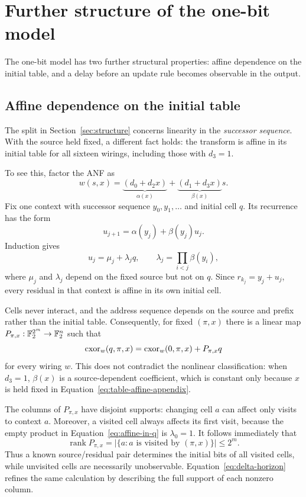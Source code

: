 \section{Further structure of the one-bit model}\label{sec:further-structure}

The one-bit model has two further structural properties: affine dependence on the initial table,
and a delay before an update rule becomes observable in the output.

\subsection{Affine dependence on the initial table}

The split in Section~\ref{sec:structure} concerns linearity in the \emph{successor sequence}.
With the source held fixed, a different fact holds: the transform is affine in its initial table
for all sixteen wirings, including those with $d_3=1$.

To see this, factor the ANF as
\begin{equation}\label{eq:factored-appendix}
  w(s,x)=\underbrace{(d_0+d_2x)}_{\alpha(x)}
        +\underbrace{(d_1+d_3x)}_{\beta(x)}s .
\end{equation}
Fix one context with successor sequence $y_0,y_1,\dots$ and initial cell $q$.  Its recurrence has
the form
\[
  u_{j+1}=\alpha(y_j)+\beta(y_j)u_j.
\]
Induction gives
\begin{equation}\label{eq:affine-in-q}
  u_j=\mu_j+\lambda_jq,
  \qquad
  \lambda_j=\prod_{i<j}\beta(y_i),
\end{equation}
where $\mu_j$ and $\lambda_j$ depend on the fixed source but not on $q$.  Since
$r_{k_j}=y_j+u_j$, every residual in that context is affine in its own initial cell.

Cells never interact, and the address sequence depends on the source and prefix rather than the
initial table.  Consequently, for fixed $(\pi,x)$ there is a linear map
$P_{\pi,x}:\mathbb{F}_2^{2^m}\to\mathbb{F}_2^n$ such that
\begin{equation}\label{eq:table-affine-appendix}
  \mathrm{cxor}_w(q,\pi,x)
  =\mathrm{cxor}_w(0,\pi,x)+P_{\pi,x}q
\end{equation}
for every wiring $w$.  This does not contradict the nonlinear classification: when $d_3=1$,
$\beta(x)$ is a source-dependent coefficient, which is constant only because $x$ is held fixed
in Equation~\eqref{eq:table-affine-appendix}.

The columns of $P_{\pi,x}$ have disjoint supports: changing cell $a$ can affect only visits to
context $a$.  Moreover, a visited cell always affects its first visit, because the empty product
in Equation~\eqref{eq:affine-in-q} is $\lambda_0=1$.  It follows immediately that
\begin{equation}\label{eq:rank-appendix}
  \operatorname{rank}P_{\pi,x}
  =\bigl|\{a:\text{$a$ is visited by $(\pi,x)$}\}\bigr|
  \le 2^m .
\end{equation}
Thus a known source/residual pair determines the initial bits of all visited cells, while
unvisited cells are necessarily unobservable.  Equation~\eqref{eq:delta-horizon} refines the same
calculation by describing the full support of each nonzero column.


